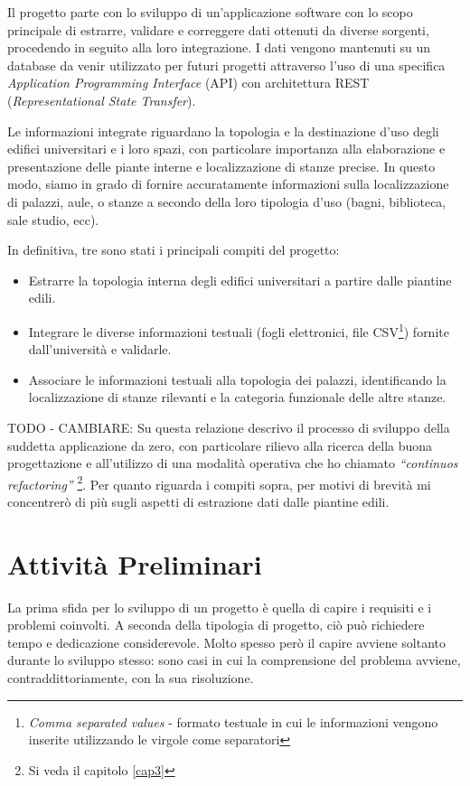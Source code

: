 \documentclass[12pt]{report}
\begin{document}
Il progetto parte con lo sviluppo di un'applicazione software con 
lo scopo principale di estrarre, validare e correggere dati 
ottenuti da diverse sorgenti, procedendo in seguito alla loro 
integrazione. I dati vengono mantenuti su un database da venir 
utilizzato per futuri progetti attraverso l'uso di una specifica 
\textit{Application Programming Interface} (API) con architettura REST 
(\textit{Representational State Transfer}). 

Le informazioni integrate riguardano la topologia e la destinazione
d'uso degli edifici universitari e i loro spazi, con particolare
importanza alla elaborazione e presentazione delle piante interne e
localizzazione di stanze precise. In questo modo, siamo in grado di
fornire accuratamente informazioni sulla localizzazione di palazzi,
aule, o stanze a secondo della loro tipologia d'uso (bagni, 
biblioteca, sale studio, ecc).

In definitiva, tre sono stati i principali compiti del progetto:
\begin{itemize}
  \item Estrarre la topologia interna degli edifici universitari a
partire dalle piantine edili.
  \item Integrare le diverse informazioni testuali (fogli elettronici,
file CSV\footnote{\textit{Comma separated values} - formato testuale
in cui le informazioni vengono inserite utilizzando le virgole come
separatori}) fornite dall'università e validarle.
  \item Associare le informazioni testuali alla topologia dei palazzi,
identificando la localizzazione di stanze rilevanti e la categoria
funzionale delle altre stanze.
\end{itemize}


TODO - CAMBIARE:
Su questa relazione descrivo il processo di sviluppo della suddetta
applicazione da zero, con particolare rilievo alla ricerca della buona
progettazione e all'utilizzo di una modalità operativa che ho chiamato
\textit{“continuos refactoring”} \footnote{Si veda il capitolo
\ref{cap3}}. Per quanto riguarda i compiti sopra, per motivi di
brevità mi concentrerò di più sugli aspetti di estrazione dati
dalle piantine edili.

% 
% 
\chapter{Attività Preliminari}
\label{cap2}

La prima sfida per lo sviluppo di un progetto è quella di capire i
requisiti e i problemi coinvolti. A seconda della tipologia di
progetto, ciò può richiedere tempo e dedicazione considerevole. Molto
spesso però il capire avviene soltanto durante lo sviluppo stesso:
sono casi in cui la comprensione del problema avviene, contraddittoriamente,
con la sua risoluzione.
\end{document}

